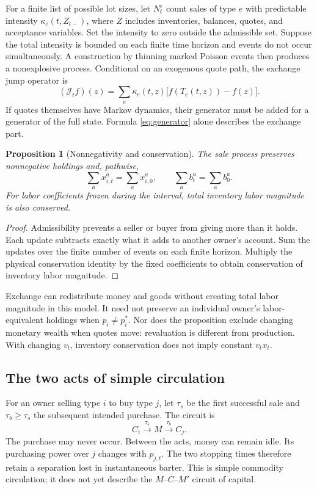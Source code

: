 \documentclass[11pt,letterpaper]{article}
\newtheorem{proposition}{Proposition}[section]
\begin{document}
For a finite list of possible lot sizes, let $N^e_t$ count sales of type
$e$ with predictable intensity $\kappa_e(t,Z_{t-})$, where $Z$ includes
inventories, balances, quotes, and acceptance variables. Set the intensity
to zero outside the admissible set. Suppose the total intensity is
bounded on each finite time horizon and events do not occur
simultaneously. A construction by thinning marked Poisson events then
produces a nonexplosive process. Conditional on an exogenous quote path,
the exchange jump operator is
\begin{equation}\label{eq:generator}
 (\mathcal J_t f)(z)=\sum_e\kappa_e(t,z)
       \bigl[f(T_e(t,z))-f(z)\bigr].
\end{equation}
If quotes themselves have Markov dynamics, their generator must be
added for a generator of the full state. Formula \eqref{eq:generator}
alone describes the exchange part.

\begin{proposition}[Nonnegativity and conservation]\label{prop:conservation}
The sale process preserves nonnegative holdings and, pathwise,
\begin{equation}\label{eq:conservation}
 \sum_a x^a_{i,t}=\sum_a x^a_{i,0},\qquad
 \sum_a b^a_t=\sum_a b^a_0.
\end{equation}
For labor coefficients frozen during the interval, total inventory labor
magnitude is also conserved.
\end{proposition}
\begin{proof}
Admissibility prevents a seller or buyer from giving more than it holds.
Each update subtracts exactly what it adds to another owner's account.
Sum the updates over the finite number of events on each finite horizon.
Multiply the physical conservation identity by the fixed coefficients
to obtain conservation of inventory labor magnitude.
\end{proof}
Exchange can redistribute money and goods without creating total labor
magnitude in this model. It need not preserve an individual owner's
labor-equivalent holdings when $p_i\ne p_i^*$. Nor does the proposition
exclude changing monetary wealth when quotes move: revaluation is
different from production. With changing $v_t$, inventory conservation
does not imply constant $v_tx_t$.

\subsection{The two acts of simple circulation}
For an owner selling type $i$ to buy type $j$, let $\tau_s$ be the first
successful sale and $\tau_b\ge\tau_s$ the subsequent intended purchase.
The circuit is
\[
 C_i\xrightarrow{\tau_s}M\xrightarrow{\tau_b}C_j.
\]
The purchase may never occur. Between the acts, money can remain idle.
Its purchasing power over $j$ changes with $p_{j,t}$. The two stopping
times therefore retain a separation lost in instantaneous barter.
This is simple commodity circulation; it does not yet describe the
$M$--$C$--$M'$ circuit of capital.
\end{document}
